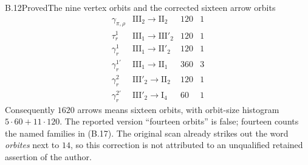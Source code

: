 \begin{result}{B.12}{Proved}{The nine vertex orbits and the corrected sixteen arrow orbits}
\[\begin{array}{c|c|r|r}
 \gamma_{\pi,\rho}&\mathrm {III}_2\to\mathrm {II}_2&120&1\\
 \tau_r^1&\mathrm {III}_1\to\mathrm {III}'_2&120&1\\
 \gamma_r^1&\mathrm {III}_1\to\mathrm {II}'_2&120&1\\
 \gamma_r^{1'}&\mathrm {III}_1\to\mathrm {II}_1&360&3\\
 \gamma_r^2&\mathrm {III}'_2\to\mathrm {II}_2&120&1\\
 \gamma_r^{2'}&\mathrm {III}'_2\to\mathrm I_4&60&1
\end{array}
\tag{B.17}
\]
Consequently $1620$ arrows means sixteen orbits, with orbit-size
histogram $5\cdot60+11\cdot120$.  The reported version ``fourteen
orbits'' is false; fourteen counts the named families in (B.17).
The original scan already strikes out the word \emph{orbites} next
to $14$, so this correction is not attributed to an unqualified
retained assertion of the author.
\end{result}
